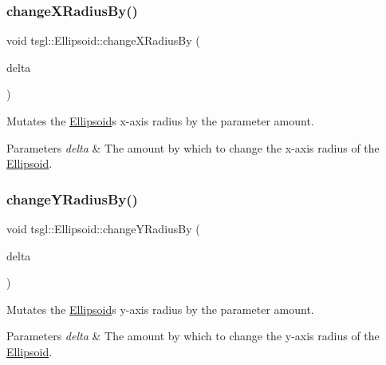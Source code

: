 \subsubsection{\texorpdfstring{change\+X\+Radius\+By()}{changeXRadiusBy()}}
{\footnotesize\ttfamily void tsgl\+::\+Ellipsoid\+::change\+X\+Radius\+By (\begin{DoxyParamCaption}\item[{G\+Lfloat}]{delta }\end{DoxyParamCaption})\hspace{0.3cm}{\ttfamily [virtual]}}



Mutates the \hyperlink{classtsgl_1_1_ellipsoid}{Ellipsoid}\textquotesingle{}s x-\/axis radius by the parameter amount. 


\begin{DoxyParams}{Parameters}
{\em delta} & The amount by which to change the x-\/axis radius of the \hyperlink{classtsgl_1_1_ellipsoid}{Ellipsoid}. \\
\hline
\end{DoxyParams}
\mbox{\label{classtsgl_1_1_ellipsoid_a84f0a1161d9047e5661de030ed924d38}} 
\subsubsection{\texorpdfstring{change\+Y\+Radius\+By()}{changeYRadiusBy()}}
{\footnotesize\ttfamily void tsgl\+::\+Ellipsoid\+::change\+Y\+Radius\+By (\begin{DoxyParamCaption}\item[{G\+Lfloat}]{delta }\end{DoxyParamCaption})\hspace{0.3cm}{\ttfamily [virtual]}}



Mutates the \hyperlink{classtsgl_1_1_ellipsoid}{Ellipsoid}\textquotesingle{}s y-\/axis radius by the parameter amount. 


\begin{DoxyParams}{Parameters}
{\em delta} & The amount by which to change the y-\/axis radius of the \hyperlink{classtsgl_1_1_ellipsoid}{Ellipsoid}. \\
\hline
\end{DoxyParams}
\mbox{\label{classtsgl_1_1_ellipsoid_a1e749caabe1c994404027c9d78098356}} 
